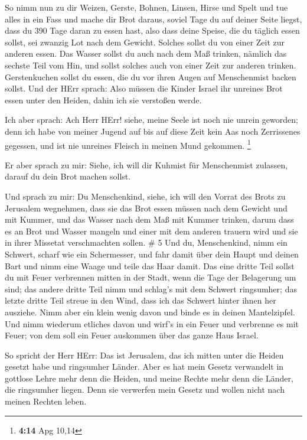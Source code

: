  So nimm nun zu dir Weizen, Gerste, Bohnen, Linsen, Hirse
und Spelt und tue alles in ein Fass und mache dir Brot daraus, soviel
Tage du auf deiner Seite liegst, dass du 390 Tage daran zu essen hast,
 also dass deine Speise, die du täglich essen sollst, sei
zwanzig Lot nach dem Gewicht. Solches sollst du von einer Zeit zur
anderen essen.  Das Wasser sollst du auch nach dem Maß
trinken, nämlich das sechste Teil vom Hin, und sollst solches auch von
einer Zeit zur anderen trinken.  Gerstenkuchen sollst du
essen, die du vor ihren Augen auf Menschenmist backen sollst.
 Und der HErr sprach: Also müssen die Kinder Israel ihr
unreines Brot essen unter den Heiden, dahin ich sie verstoßen werde.

 Ich aber sprach: Ach Herr HErr! siehe, meine Seele ist
noch nie unrein geworden; denn ich habe von meiner Jugend auf bis auf
diese Zeit kein Aas noch Zerrissenes gegessen, und ist nie unreines
Fleisch in meinen Mund gekommen. \footnote{\textbf{4:14} Apg 10,14}

 Er aber sprach zu mir: Siehe, ich will dir Kuhmist für
Menschenmist zulassen, darauf du dein Brot machen sollst.

 Und sprach zu mir: Du Menschenkind, siehe, ich will den
Vorrat des Brots zu Jerusalem wegnehmen, dass sie das Brot essen müssen
nach dem Gewicht und mit Kummer, und das Wasser nach dem Maß mit Kummer
trinken,  darum dass es an Brot und Wasser mangeln und
einer mit dem anderen trauern wird und sie in ihrer Missetat
verschmachten sollen. \# 5  Und du, Menschenkind, nimm ein
Schwert, scharf wie ein Schermesser, und fahr damit über dein Haupt und
deinen Bart und nimm eine Waage und teile das Haar damit. 
Das eine dritte Teil sollst du mit Feuer verbrennen mitten in der Stadt,
wenn die Tage der Belagerung um sind; das andere dritte Teil nimm und
schlag's mit dem Schwert ringsumher; das letzte dritte Teil streue in
den Wind, dass ich das Schwert hinter ihnen her ausziehe. 
Nimm aber ein klein wenig davon und binde es in deinen Mantelzipfel.
 Und nimm wiederum etliches davon und wirf's in ein Feuer
und verbrenne es mit Feuer; von dem soll ein Feuer auskommen über das
ganze Haus Israel.

 So spricht der Herr HErr: Das ist Jerusalem, das ich mitten
unter die Heiden gesetzt habe und ringsumher Länder.  Aber
es hat mein Gesetz verwandelt in gottlose Lehre mehr denn die Heiden,
und meine Rechte mehr denn die Länder, die ringsumher liegen. Denn sie
verwerfen mein Gesetz und wollen nicht nach meinen Rechten leben.

